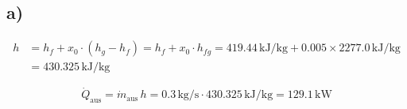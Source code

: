 

\subsection*{a)}
\begin{align*}
h &= h_f + x_0 \cdot (h_g - h_f) = h_f + x_0 \cdot h_{fg} = 419.44 \, \text{kJ/kg} + 0.005 \times 2277.0 \, \text{kJ/kg} \\
&= 430.325 \, \text{kJ/kg}
\end{align*}

\[
\dot{Q}_{\text{aus}} = \dot{m}_{\text{aus}} \, h = 0.3 \, \text{kg/s} \cdot 430.325 \, \text{kJ/kg} = 129.1 \, \text{kW}
\]